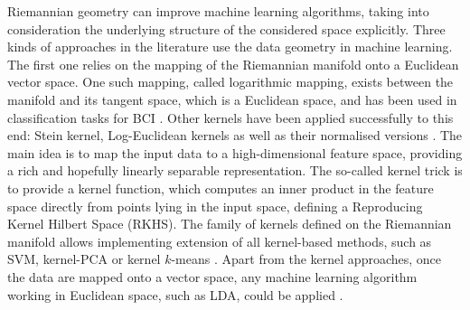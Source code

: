 Riemannian geometry can improve machine learning algorithms, taking into consideration the underlying structure of the considered space explicitly.
Three kinds of approaches in the literature use the data geometry in machine learning. 
The first one relies on the mapping of the Riemannian manifold onto a Euclidean vector space. %
One such mapping, called logarithmic mapping, exists between the manifold and its tangent space, which is a Euclidean space, and has been used in classification tasks for BCI \citep{barachant_bci_2012,barachant_classification_2013}. 
Other kernels have been applied successfully to this end: Stein kernel, Log-Euclidean kernels as well as their normalised versions \citep{yger_review_2013}.
The main idea is to map the input data to a high-dimensional feature space, providing a rich and hopefully linearly separable representation.
The so-called kernel trick is to provide a kernel function, which computes an inner product in the feature space directly from points lying in the input space, defining a Reproducing Kernel Hilbert Space (RKHS).
The family of kernels defined on the Riemannian manifold allows implementing extension of all kernel-based methods, such as SVM, kernel-PCA or kernel $k$-means \citep{jayasumana_kernel_2013}.
Apart from the kernel approaches, once the data are mapped onto a vector space, any machine learning algorithm working in Euclidean space, such as LDA, could be applied \citep{barachant_multiclass_2012}.

